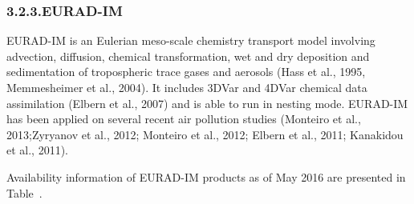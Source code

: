\documentclass[9pt]{report}
\begin{document}
\subsubsection{3.2.3.\hspace*{0.5em}EURAD-IM}\label{sec-eurad-im}%

\noindent{}EURAD-IM is an Eulerian meso-scale chemistry transport model involving advection, diffusion, chemical transformation, wet and dry deposition and sedimentation of tropospheric trace gases and aerosols (Hass et al., 1995, Memmesheimer et al., 2004). It includes 3DVar and 4DVar chemical data assimilation (Elbern et al., 2007) and is able to run in nesting mode.
EURAD-IM has been applied on several recent air pollution studies (Monteiro et al., 2013;Zyryanov et al., 2012; Monteiro et al., 2012; Elbern et al., 2011; Kanakidou et al., 2011).%

Availability information of EURAD-IM products as of May 2016 are presented in Table~.%
\end{document}
